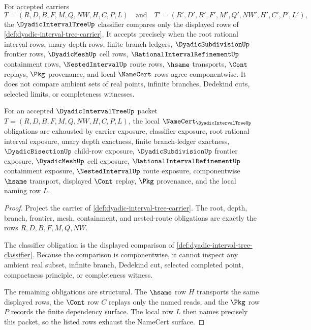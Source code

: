 \begin{definition}
\label{def:dyadic-interval-tree-classifier}
For accepted carriers
$$
T=(R,D,B,F,M,Q,NW,H,C,P,L)
\quad\text{and}\quad
T'=(R',D',B',F',M',Q',NW',H',C',P',L'),
$$
the $\DyadicIntervalTreeUp$ classifier compares only the displayed rows of \autoref{def:dyadic-interval-tree-carrier}. It accepts precisely when the root rational interval rows, unary depth rows, finite branch ledgers, $\DyadicSubdivisionUp$ frontier rows, $\DyadicMeshUp$ cell rows, $\RationalIntervalRefinementUp$ containment rows, $\NestedIntervalUp$ route rows, $\hsame$ transports, $\Cont$ replays, $\Pkg$ provenance, and local $\NameCert$ rows agree componentwise. It does not compare ambient sets of real points, infinite branches, Dedekind cuts, selected limits, or completeness witnesses.
\end{definition}

\begin{theorem}
\label{thm:dyadic-interval-tree-namecert-obligations}
For an accepted $\DyadicIntervalTreeUp$ packet $T=(R,D,B,F,M,Q,NW,H,C,P,L)$, the local $\NameCert_{\DyadicIntervalTreeUp}$ obligations are exhausted by carrier exposure, classifier exposure, root rational interval exposure, unary depth exactness, finite branch-ledger exactness, $\DyadicBisectionUp$ child-row exposure, $\DyadicSubdivisionUp$ frontier exposure, $\DyadicMeshUp$ cell exposure, $\RationalIntervalRefinementUp$ containment exposure, $\NestedIntervalUp$ route exposure, componentwise $\hsame$ transport, displayed $\Cont$ replay, $\Pkg$ provenance, and the local naming row $L$.
\end{theorem}
\begin{proof}
Project the carrier of \autoref{def:dyadic-interval-tree-carrier}. The root, depth, branch, frontier, mesh, containment, and nested-route obligations are exactly the rows $R,D,B,F,M,Q,NW$.

The classifier obligation is the displayed comparison of \autoref{def:dyadic-interval-tree-classifier}. Because the comparison is componentwise, it cannot inspect any ambient real subset, infinite branch, Dedekind cut, selected completed point, compactness principle, or completeness witness.

The remaining obligations are structural. The $\hsame$ row $H$ transports the same displayed rows, the $\Cont$ row $C$ replays only the named reads, and the $\Pkg$ row $P$ records the finite dependency surface. The local row $L$ then names precisely this packet, so the listed rows exhaust the NameCert surface.
\end{proof}

